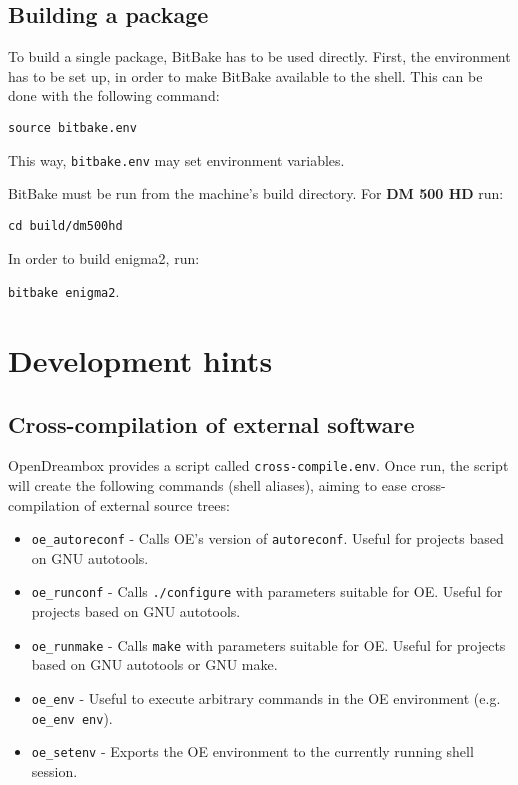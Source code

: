 \documentclass[a4paper]{article}
\newcommand{\shell}[1]{\texttt{\small #1}}
\begin{document}
  \subsection{Building a package}
     To build a single package, BitBake has to be used directly. First, the environment
     has to be set up, in order to make BitBake available to the shell. This can be done
     with the following command:

     \shell{source bitbake.env}

     This way, \shell{bitbake.env} may set environment variables.

     BitBake must be run from the machine's build directory. For \textbf{DM 500 HD} run:

     \shell{cd build/dm500hd}

     In order to build enigma2, run:

     \shell{bitbake enigma2}.

\section{Development hints}

  \subsection{Cross-compilation of external software}
    OpenDreambox provides a script called \shell{cross-compile.env}. Once run, the script will create
    the following commands (shell aliases), aiming to ease cross-compilation of external source trees:

    \begin{itemize}
      \item \shell{oe\_autoreconf} - Calls OE's version of \shell{autoreconf}. Useful for projects based on GNU autotools.
      \item \shell{oe\_runconf} - Calls \shell{./configure} with parameters suitable for OE. Useful for projects based on GNU autotools.
      \item \shell{oe\_runmake} - Calls \shell{make} with parameters suitable for OE. Useful for projects based on GNU autotools or GNU make.
      \item \shell{oe\_env} - Useful to execute arbitrary commands in the OE environment (e.g. \shell{oe\_env env}).
      \item \shell{oe\_setenv} - Exports the OE environment to the currently running shell session.
    \end{itemize}
\end{document}

